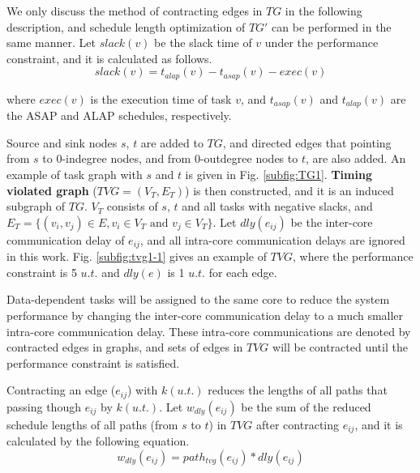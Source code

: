 \documentclass[10pt,journal]{IEEEtran}
\begin{document}
We only discuss the method of contracting edges in $TG$ in the following description, and schedule length optimization of $TG'$ can be performed in the same manner. Let $slack(v)$ be the slack time of $v$ under the performance constraint, and it is calculated as follows.
\begin{equation}
slack(v) = t_{alap}(v)-t_{asap}(v)-exec(v)
\end{equation}

\noindent where $exec(v)$ is the execution time of task $v$, and $t_{asap}(v)$ and $t_{alap}(v)$ are the ASAP and ALAP schedules, respectively.%

Source and sink nodes $s$, $t$ are added to $TG$, and directed edges that pointing from $s$ to 0-indegree nodes, and from 0-outdegree nodes to $t$, are also added. An example of task graph with $s$ and $t$ is given in Fig. \ref{subfig:TG1}. \textbf{Timing violated graph} ($TVG=(V_T, E_T)$) is then constructed, and it is an induced subgraph of $TG$. $V_T$ consists of $s$, $t$ and all tasks with negative slacks, and $E_T=\{(v_i,v_j)\in E, v_i\in V_T \textrm{~and~} v_j\in V_T\}$. Let $dly(e_{ij})$ be the inter-core communication delay of $e_{ij}$, and all intra-core communication delays are ignored in this work. Fig. \ref{subfig:tvg1-1} gives an example of $TVG$, where the performance constraint is 5 $u.t.$ and $dly(e)$ is 1 $u.t.$ for each edge.


Data-dependent tasks will be assigned to the same core to reduce the system performance by changing the inter-core communication delay to a much smaller intra-core communication delay. These intra-core communications are denoted by contracted edges in graphs, and sets of edges in $TVG$ will be contracted until the performance constraint is satisfied.%




Contracting an edge ($e_{ij}$) with $k(u.t.)$ reduces the lengths of all paths that passing though $e_{ij}$ by $k(u.t.)$. Let $w_{dly}(e_{ij})$ be the sum of the reduced schedule lengths of all paths (from $s$ to $t$) in $TVG$ after contracting $e_{ij}$, and it is calculated by the following equation.
\begin{equation}
w_{dly}(e_{ij})=path_{tvg}(e_{ij})*dly(e_{ij})
\end{equation}
\end{document}
